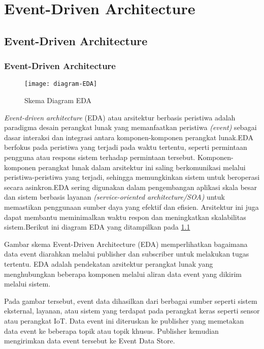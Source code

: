 \chapter{Event-Driven Architecture}


\section{Event-Driven Architecture}
\subsection{Event-Driven Architecture}
\begin{figure}[h]
	\centering
	\texttt{[image: diagram-EDA]}
	\caption{Skema Diagram EDA}
	\label{fig:diagram-EDA}
\end{figure}
\textit{Event-driven architecture} (EDA) atau arsitektur berbasis peristiwa adalah paradigma desain perangkat lunak yang memanfaatkan peristiwa \textit{(event)} sebagai dasar interaksi dan integrasi antara komponen-komponen perangkat lunak.EDA berfokus pada peristiwa yang terjadi pada waktu tertentu, seperti permintaan pengguna atau respons sistem terhadap permintaan tersebut. Komponen-komponen perangkat lunak dalam arsitektur ini saling berkomunikasi melalui peristiwa-peristiwa yang terjadi, sehingga memungkinkan sistem untuk beroperasi secara asinkron.EDA sering digunakan dalam pengembangan aplikasi skala besar dan sistem berbasis layanan \textit{ (service-oriented architecture/SOA)} untuk memastikan penggunaan sumber daya yang efektif dan efisien. Arsitektur ini juga dapat membantu meminimalkan waktu respon dan meningkatkan skalabilitas sistem.Berikut ini diagram EDA yang ditampilkan pada \ref{fig:diagram-EDA}

Gambar skema Event-Driven Architecture (EDA) memperlihatkan bagaimana data event diarahkan melalui publisher dan subscriber untuk melakukan tugas tertentu. EDA adalah pendekatan arsitektur perangkat lunak yang menghubungkan beberapa komponen melalui aliran data event yang dikirim melalui sistem.

Pada gambar tersebut, event data dihasilkan dari berbagai sumber seperti sistem eksternal, layanan, atau sistem yang terdapat pada perangkat keras seperti sensor atau perangkat IoT. Data event ini diteruskan ke publisher yang memetakan data event ke beberapa topik atau topik khusus. Publisher kemudian mengirimkan data event tersebut ke Event Data Store.

